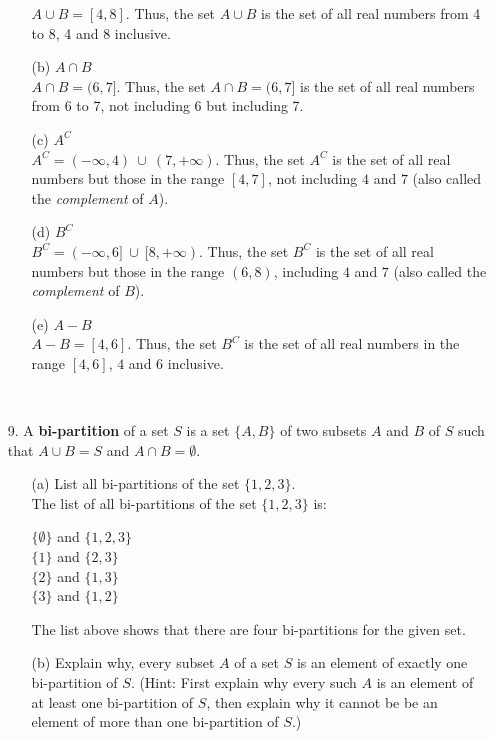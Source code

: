 \documentclass[12pt, a4paper]{article}                  %
\begin{document}
\begin{enumerate}
\begin{enumerate}
$A \cup B = [4,8]$. Thus, the set $A \cup B$ is the set of all real numbers
from 4 to 8, 4 and 8 inclusive.
\\
\item[(b)]
$A \cap B$\\

$A \cap B = (6,7]$. Thus, the set $A \cap B = (6,7]$ is the set of all real numbers
from 6 to 7, not including 6 but including 7.
\\
\item[(c)]
$A^C$\\

$A^C = (-\infty, 4) \ \cup \ (7, +\infty)$. Thus, the set $A^C$ is the set of all real numbers
but those in the range $[4,7]$, not including $4$ and $7$ (also called the \textit{complement} of $A$).
\\
\item[(d)]
$B^C$\\

$B^C = (-\infty, 6] \ \cup \ [8, +\infty)$. Thus, the set $B^C$ is the set of all real numbers
but those in the range $(6,8)$, including $4$ and $7$ (also called the \textit{complement} of $B$).
\\

\item[(e)]
$A - B$\\

$A - B = [4,6]$. Thus, the set $B^C$ is the set of all real numbers
in the range $[4,6]$, $4$ and $6$ inclusive.
\end{enumerate}

\

\item[9.]
A \textbf{bi-partition} of a set $S$ is a set $\{A,B\}$ of two subsets
$A$ and $B$ of $S$ such that $A \cup B = S$ and $A \cap B = \emptyset$.
\begin{enumerate}
\item[(a)]
List all bi-partitions of the set $\{1,2,3\}$.
\\

The list of all bi-partitions of the set $\{1,2,3\}$ is:
\begin{center}
$\{\emptyset\}$ and $\{1,2,3\}$\\
$\{1\}$ and $\{2,3\}$\\
$\{2\}$ and $\{1,3\}$\\
$\{3\}$ and $\{1,2\}$\\
\end{center}
The list above shows that there are four bi-partitions for the given set.
\\
\item[(b)]
Explain why, every subset $A$ of a set $S$ is an element of exactly one bi-partition of
$S$. (Hint: First explain why every such $A$ is an element of at least one bi-partition
of $S$, then explain why it cannot be be an element of more than one bi-partition
of $S$.)
\\


\end{enumerate}
\end{enumerate}
\end{document}
